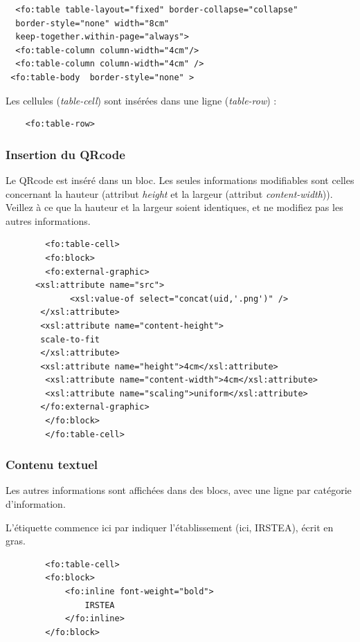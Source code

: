 \begin{lstlisting}
  <fo:table table-layout="fixed" border-collapse="collapse"  
  border-style="none" width="8cm" 
  keep-together.within-page="always">
  <fo:table-column column-width="4cm"/>
  <fo:table-column column-width="4cm" />
 <fo:table-body  border-style="none" >
\end{lstlisting}

Les cellules (\textit{table-cell}) sont insérées dans une ligne (\textit{table-row}) :

\begin{lstlisting}
 	<fo:table-row>
\end{lstlisting}

\subsubsection{Insertion du QRcode}
Le QRcode est inséré dans un bloc. Les seules informations modifiables sont celles concernant la hauteur (attribut \textit{height} et la largeur (attribut \textit{content-width})). Veillez à ce que la hauteur et la largeur soient identiques, et ne modifiez pas les autres informations.

\begin{lstlisting}
  		<fo:table-cell> 
  		<fo:block>
  		<fo:external-graphic>
      <xsl:attribute name="src">
             <xsl:value-of select="concat(uid,'.png')" />
       </xsl:attribute>
       <xsl:attribute name="content-height">
       scale-to-fit
       </xsl:attribute>
       <xsl:attribute name="height">4cm</xsl:attribute>
        <xsl:attribute name="content-width">4cm</xsl:attribute>
        <xsl:attribute name="scaling">uniform</xsl:attribute>      
       </fo:external-graphic>
 		</fo:block>
   		</fo:table-cell>
\end{lstlisting}
\subsubsection{Contenu textuel}

Les autres informations sont affichées dans des blocs, avec une ligne par catégorie d'information.

L'étiquette commence ici par indiquer l'établissement (ici, IRSTEA), écrit en gras.

\begin{lstlisting}
  		<fo:table-cell>
		<fo:block>
			<fo:inline font-weight="bold">
				IRSTEA
			</fo:inline>
		</fo:block>
\end{lstlisting}


